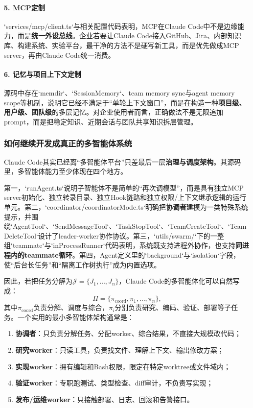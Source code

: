 \documentclass[12pt,a4paper]{article}
\begin{document}
\paragraph{5. MCP定制}

`services/mcp/client.ts`与相关配置代码表明，MCP在Claude Code中不是边缘能力，而是\textbf{统一外设总线}。企业若要让Claude Code接入GitHub、Jira、内部知识库、构建系统、实验平台，最干净的方法不是硬写新工具，而是优先做成MCP server，再由Claude Code统一消费。

\paragraph{6. 记忆与项目上下文定制}

源码中存在`memdir`、`SessionMemory`、team memory sync与agent memory scope等机制，说明它已经不满足于“单轮上下文窗口”，而是在构造一种\textbf{项目级、用户级、团队级}的多层记忆。对企业使用者而言，正确做法不是无限追加prompt，而是把稳定知识、近期会话与团队共享知识拆层管理。

\subsubsection{如何继续开发成真正的多智能体系统}

Claude Code其实已经离“多智能体平台”只差最后一层\textbf{治理与调度架构}。其源码里，多智能体能力至少体现在四个地方。

第一，`runAgent.ts`说明子智能体不是简单的“再次调模型”，而是具有独立MCP server初始化、独立转录目录、独立Hook链路和独立权限/上下文继承逻辑的运行单元。第二，`coordinator/coordinatorMode.ts`明确把\textbf{协调者}建模为一类特殊系统提示，并围绕`AgentTool`、`SendMessageTool`、`TaskStopTool`、`TeamCreateTool`、`TeamDeleteTool`设计了leader-worker协作协议。第三，`utils/swarm/`下的一整组`teammate`与`inProcessRunner`代码表明，系统既支持进程外协作，也支持\textbf{同进程内的teammate循环}。第四，Agent定义里的`background`与`isolation`字段，使“后台长任务”和“隔离工作树执行”成为内置选项。

因此，若把任务分解为$\mathcal{J}=\{J_1,\ldots,J_n\}$，Claude Code的多智能体化可以自然写成：
\begin{equation}
\Pi = \{\pi_{\text{coord}}, \pi_1,\ldots,\pi_n\},
\end{equation}
其中$\pi_{\text{coord}}$负责分解、调度与综合，$\pi_i$分别负责研究、编码、验证、部署等子任务。一个实用的最小多智能体架构通常是：
\begin{enumerate}
    \item \textbf{协调者}：只负责分解任务、分配worker、综合结果，不直接大规模改代码；
    \item \textbf{研究worker}：只读工具，负责找文件、理解上下文、输出修改方案；
    \item \textbf{实现worker}：拥有编辑和Bash权限，限定在特定worktree或文件域内；
    \item \textbf{验证worker}：专职跑测试、类型检查、diff审计，不负责写实现；
    \item \textbf{发布/运维worker}：只接触部署、日志、回滚和告警接口。
\end{enumerate}
\end{document}
